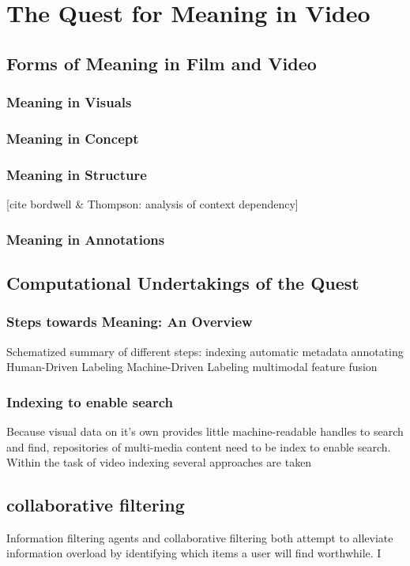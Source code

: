 \chapter{The Quest for Meaning in Video}
\label{ch:quest}

\section{Forms of Meaning in Film and Video}

\subsection{Meaning in Visuals}
\cite{Bruno:2002tt}

\subsection{Meaning in Concept}
\subsection{Meaning in Structure}
[cite bordwell \& Thompson: analysis of context dependency]

\subsection{Meaning in Annotations}
\cite{Kuwano:2000wy}

\section{Computational Undertakings of the Quest}

\subsection{Steps towards Meaning: An Overview}

Schematized summary of different steps:
indexing
automatic metadata
annotating
  Human-Driven Labeling
  Machine-Driven Labeling
multimodal feature fusion
  


\subsection{Indexing to enable search}
Because visual data on it's own provides little machine-readable handles to search and find, repositories of multi-media content need to be index to enable search. Within the task of video indexing several approaches are taken 


\section{collaborative filtering}
Information filtering agents and collaborative filtering both
attempt to alleviate information overload by identifying
which items a user will find worthwhile.  I